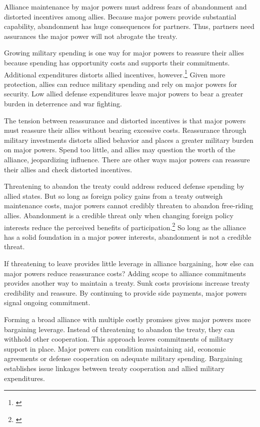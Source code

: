 \documentclass[12pt]{article}
\begin{document}
Alliance maintenance by major powers must address fears of abandonment and distorted incentives among allies. 
Because major powers provide substantial capability, abandonment has huge consequences for partners. 
Thus, partners need assurances the major power will not abrogate the treaty. 


Growing military spending is one way for major powers to reassure their allies because spending has opportunity costs and supports their commitments. 
Additional expenditures distorts allied incentives, however.\footnote{\citep{Lake1996, Lake2009}}
Given more protection, allies can reduce military spending and rely on major powers for security.
Low allied defense expenditures leave major powers to bear a greater burden in deterrence and war fighting. 


The tension between reassurance and distorted incentives is that major powers must reassure their allies without bearing excessive costs.
Reassurance through military investments distorts allied behavior and places a greater military burden on major powers. 
Spend too little, and allies may question the worth of the alliance, jeopardizing influence.   
There are other ways major powers can reassure their allies and check distorted incentives. 


Threatening to abandon the treaty could address reduced defense spending by allied states. 
But so long as foreign policy gains from a treaty outweigh maintenance costs, major powers cannot credibly threaten to abandon free-riding allies. 
Abandonment is a credible threat only when changing foreign policy interests reduce the perceived benefits of participation.\footnote{\citep{LeedsSavun2007}}
So long as the alliance has a solid foundation in a major power interests, abandonment is not a credible threat. 


If threatening to leave provides little leverage in alliance bargaining, how else can major powers reduce reassurance costs? 
Adding scope to alliance commitments provides another way to maintain a treaty.
Sunk costs provisions increase treaty credibility and reassure.
By continuing to provide side payments, major powers signal ongoing commitment. 

 
Forming a broad alliance with multiple costly promises gives major powers more bargaining leverage. 
Instead of threatening to abandon the treaty, they can withhold other cooperation.
This approach leaves commitments of military support in place.  
Major powers can condition maintaining aid, economic agreements or defense cooperation on adequate military spending.
Bargaining establishes issue linkages between treaty cooperation and allied military expenditures. 
\end{document}
